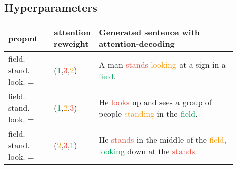 \documentclass[11pt,a4paper]{article}
\newcommand{\alg}{attention modulation}
\begin{document}
\subsection{Hyperparameters}
 \begin{table*}[!ht]
    \centering
    \begin{tabular}{p{0.2\linewidth} |p{0.1\linewidth}| p{0.6\linewidth}}
    \toprule
      propmt & attention reweight & Generated sentence with attention-decoding \\\midrule
field. stand. look. = & (\textcolor[HTML]{00a65a}{1},\textcolor[HTML]{e74c3c}{3},\textcolor[HTML]{f39c12}{2}) & A man \textcolor[HTML]{e74c3c}{stands} \textcolor[HTML]{f39c12}{looking} at a sign in a \textcolor[HTML]{00a65a}{field}.\\ 
field. stand. look. = & (\textcolor[HTML]{00a65a}{1},\textcolor[HTML]{f39c12}{2},\textcolor[HTML]{e74c3c}{3})  & He \textcolor[HTML]{e74c3c}{looks} up and sees a group of people \textcolor[HTML]{f39c12}{standing} in the \textcolor[HTML]{00a65a}{field}.\\ 
field. stand. look. = & (\textcolor[HTML]{f39c12}{2},\textcolor[HTML]{e74c3c}{3},\textcolor[HTML]{00a65a}{1}) & He \textcolor[HTML]{e74c3c}{stands} in the middle of the \textcolor[HTML]{f39c12}{field}, \textcolor[HTML]{00a65a}{looking} down at the \textcolor[HTML]{e74c3c}{stands}.\\ \bottomrule
    \end{tabular}
    \caption{ An example of \alg{} with different attention reweighting functions on CommonGen dev set. Only by redistributing the sentence-level attention during inference, we can generate sentences following the desired order specified in the attention reweighting function.}
    \label{tab:example_different_reweight}
\end{table*}

\begin{table*}[t]\footnotesize
\centering
{}
\caption{Results on CommonGen test set with beam search and permutations defined in \ref{appendix:permutation}.}\label{tab:commongen_permutation}
\end{table*}
\end{document}
